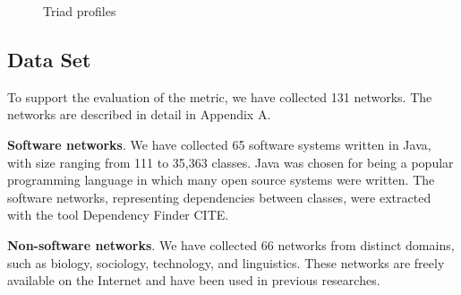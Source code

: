 \begin{figure}[!t]
\center
{}
\hfil
{}
\caption{Triad profiles}
\label{fig:profiles}
\end{figure}

\subsection{Data Set}

To support the evaluation of the metric, we have collected 131 networks. The
networks are described in detail in Appendix A.

\textbf{Software networks}. We have collected 65 software systems written in
Java, with size ranging from 111 to 35,363 classes. Java was chosen for being a
popular programming language in which many open source systems were written. The
software networks, representing dependencies between classes, were extracted
with the tool Dependency Finder CITE.

\textbf{Non-software networks}. We have collected 66 networks from distinct
domains, such as biology, sociology, technology, and linguistics. These networks
are freely available on the Internet and have been used in previous researches.

